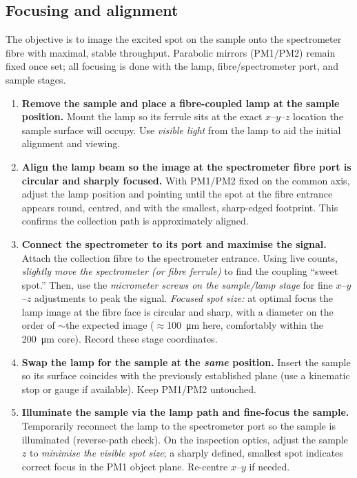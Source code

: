 \documentclass[
	parskip=half,
	a4paper,
]{scrarticle}
\begin{document}
\subsection{Focusing and alignment}
The objective is to image the excited spot on the sample onto the spectrometer fibre with maximal, stable throughput. Parabolic mirrors (PM1/PM2) remain fixed once set; all focusing is done with the lamp, fibre/spectrometer port, and sample stages.

\begin{enumerate}
  \item \textbf{Remove the sample and place a fibre-coupled lamp at the sample position.}
  Mount the lamp so its ferrule sits at the exact $x$–$y$–$z$ location the sample surface will occupy. Use \emph{visible light} from the lamp to aid the initial alignment and viewing.

  \item \textbf{Align the lamp beam so the image at the spectrometer fibre port is circular and sharply focused.}
  With PM1/PM2 fixed on the common axis, adjust the lamp position and pointing until the spot at the fibre entrance appears round, centred, and with the smallest, sharp-edged footprint. This confirms the collection path is approximately aligned.

  \item \textbf{Connect the spectrometer to its port and maximise the signal.}
  Attach the collection fibre to the spectrometer entrance. Using live counts, \emph{slightly move the spectrometer (or fibre ferrule)} to find the coupling “sweet spot.” Then, use the \emph{micrometer screws on the sample/lamp stage} for fine $x$–$y$–$z$ adjustments to peak the signal. 
  \emph{Focused spot size:} at optimal focus the lamp image at the fibre face is circular and sharp, with a diameter on the order of \(\sim\)the expected image (\(\approx\)\SI{100}{\micro\metre} here, comfortably within the \SI{200}{\micro\metre} core). Record these stage coordinates.

  \item \textbf{Swap the lamp for the sample at the \emph{same} position.}
  Insert the sample so its surface coincides with the previously established plane (use a kinematic stop or gauge if available). Keep PM1/PM2 untouched.

  \item \textbf{Illuminate the sample via the lamp path and fine-focus the sample.}
  Temporarily reconnect the lamp to the spectrometer port so the sample is illuminated (reverse-path check). On the inspection optics, adjust the sample $z$ to \emph{minimise the visible spot size}; a sharply defined, smallest spot indicates correct focus in the PM1 object plane. Re-centre $x$–$y$ if needed.


\end{enumerate}
\end{document}
